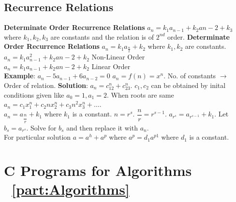 \documentclass[a4paper,oneside]{book}
\begin{document}
\chapter{Recurrence Relations}
\textbf{Determinate Order Recurrence Relations} $a_n = k_1a_{n-1} + k_2a{n-2} + k_3$ where $k_1, k_2, k_3$ are constants and the relation is of $2^{nd}$ order.
\textbf{Determinate Order Recurrence Relations} $a_n = k_1a_{\frac{n}{2}} + k_2$ where $k_1, k_2$ are constants.
$a_n = k_1a^2_{n-1} + k_2a{n-2} + k_2$ Non-Linear Order\\
$a_n = k_1a_{n-1} + k_2a{n-2} + k_2$ Linear Order\\
\textbf{Example}: $a_n - 5a_{n-1} + 6a_{n-2} = 0$ 
$a_n = f(n )= x^n$. No. of constants $\to$ Order of relation. \textbf{Solution}: $a_n = c_12^n + c_23^n$. $c_1, c_2$ can be obtained by inital conditions given like $a_0 = 1, a_1 = 2$. When roots are same $a_n = c_1x_1^n + c_2nx_2^n + c_3n^2x_3^n + \ldots$.\\
$a_n = a_{\dfrac{n}{r}} + k_1$ where $k_1$ is a constant. $n = r^{s}$. $\dfrac{n}{r} = r^{s-1}$. $a_{r^s} = a_{r^{s-1}} + k_1$. Let $b_s = a_{r^s}$. Solve for $b_s$ and then replace it with $a_n$.\\
For particular solution $a = a^h + a^p$ where $a^p = d_1a^{p1}$ where $d_1$ is a constant. 






















\part{C Programs for Algorithms ~\ref{part:Algorithms} \cite{algorithms}}
\end{document}

